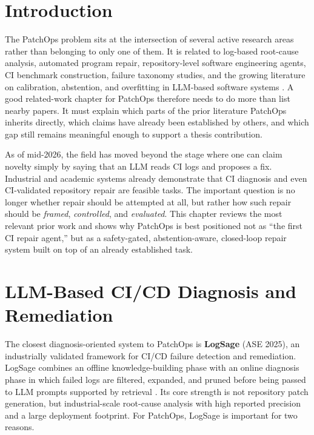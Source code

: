 \section{Introduction}

The PatchOps problem sits at the intersection of several active research areas rather than belonging to only one
of them. It is related to log-based root-cause analysis, automated program repair, repository-level software
engineering agents, CI benchmark construction, failure taxonomy studies, and the growing literature on
calibration, abstention, and overfitting in LLM-based software systems
\cite{logsage2025,llmaprsurvey2025,abstentionSurvey2026,aprtop2025}. A good related-work chapter for
PatchOps therefore needs to do more than list nearby papers. It must explain which parts of the prior literature
PatchOps inherits directly, which claims have already been established by others, and which gap still remains
meaningful enough to support a thesis contribution.

As of mid-2026, the field has moved beyond the stage where one can claim novelty simply by saying that an LLM
reads CI logs and proposes a fix. Industrial and academic systems already demonstrate that CI diagnosis and even
CI-validated repository repair are feasible tasks. The important question is no longer whether repair should be
attempted at all, but rather how such repair should be \emph{framed}, \emph{controlled}, and \emph{evaluated}.
This chapter reviews the most relevant prior work and shows why PatchOps is best positioned not as ``the first
CI repair agent,'' but as a safety-gated, abstention-aware, closed-loop repair system built on top of an
already established task.

\section{LLM-Based CI/CD Diagnosis and Remediation}

The closest diagnosis-oriented system to PatchOps is \textbf{LogSage} (ASE 2025), an industrially validated
framework for CI/CD failure detection and remediation. LogSage combines an offline knowledge-building phase
with an online diagnosis phase in which failed logs are filtered, expanded, and pruned before being passed to
LLM prompts supported by retrieval \cite{logsage2025}. Its core strength is not repository patch generation, but industrial-scale
root-cause analysis with high reported precision and a large deployment footprint. For PatchOps, LogSage is
important for two reasons.

